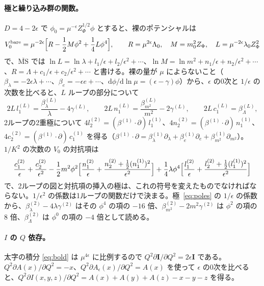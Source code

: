 \documentclass[a4paper,10pt]{ltjsarticle}
\newcommand{\dd}{\mathrm{d}}
\newcommand{\MSbar}{\overline{\mathrm{MS}}}
\newcommand{\Aeps}{A_\epsilon}
\begin{document}
\paragraph{極と繰り込み群の関数。}$D=4-2\epsilon$ で $\phi_0=\mu^{-\epsilon}Z_\Phi^{1/2}\phi$ とすると、裸のポテンシャルは
\begin{equation*}
V_0^{\mathrm{bare}}=\mu^{-2\epsilon}\Bigl[R-\frac12M\phi^2+\frac14L\phi^4\Bigr],\qquad R=\mu^{2\epsilon}\Lambda_0,\quad M=m_0^2Z_\Phi,\quad L=\mu^{-2\epsilon}\lambda_0Z_\Phi^2
\end{equation*}
で、$\MSbar$ では $\ln L=\ln\lambda+l_1/\epsilon+l_2/\epsilon^2+\cdots$、$\ln M=\ln m^2+n_1/\epsilon+n_2/\epsilon^2+\cdots$、$R=\Lambda+c_1/\epsilon+c_2/\epsilon^2+\cdots$ と書ける。裸の量が $\mu$ によらないこと（$\beta_\lambda=-2\epsilon\lambda+\cdots$、$\beta_e=-\epsilon e+\cdots$、$\dd\phi/\dd\ln\mu=(\epsilon-\gamma)\phi$）から、$\epsilon$ の0次と $1/\epsilon$ の次数を比べると、$L$ ループの部分について
\begin{equation*}
2L\,l_1^{(L)}=\frac{\beta_\lambda^{(L)}}\lambda-4\gamma^{(L)},\qquad 2L\,n_1^{(L)}=\frac{\beta_{m^2}^{(L)}}{m^2}-2\gamma^{(L)},\qquad 2L\,c_1^{(L)}=\beta_\Lambda^{(L)},
\end{equation*}
2ループの2重極について $4l_2^{(2)}=(\beta^{(1)}\!\cdot\partial)\,l_1^{(1)}$、$4n_2^{(2)}=(\beta^{(1)}\!\cdot\partial)\,n_1^{(1)}$、$4c_2^{(2)}=(\beta^{(1)}\!\cdot\partial)\,c_1^{(1)}$ を得る（$\beta^{(1)}\!\cdot\partial=\beta_\lambda^{(1)}\partial_\lambda+\beta_e^{(1)}\partial_e+\beta_{m^2}^{(1)}\partial_{m^2}$）。$1/K^2$ の次数の $V_0$ の対抗項は
\begin{equation*}
\frac{c_1^{(2)}}\epsilon+\frac{c_2^{(2)}}{\epsilon^2}-\frac12m^2\phi^2\Bigl[\frac{n_1^{(2)}}\epsilon+\frac{n_2^{(2)}+\frac12(n_1^{(1)})^2}{\epsilon^2}\Bigr]+\frac14\lambda\phi^4\Bigl[\frac{l_1^{(2)}}\epsilon+\frac{l_2^{(2)}+\frac12(l_1^{(1)})^2}{\epsilon^2}\Bigr]
\end{equation*}
で、2ループの図と対抗項の挿入の極は、これの符号を変えたものでなければならない。$1/\epsilon^2$ の係数は1ループの関数だけで決まる。極~\eqref{eq:poles} の $1/\epsilon$ の係数から、$\beta_\lambda^{(2)}-4\lambda\gamma^{(2)}$ はその $\phi^4$ の項の $-16$ 倍、$\beta_{m^2}^{(2)}-2m^2\gamma^{(2)}$ は $\phi^2$ の項の $8$ 倍、$\beta_\Lambda^{(2)}$ は $\phi^0$ の項の $-4$ 倍として読める。

\paragraph{$I$ の $Q$ 依存。}太字の積分 \eqref{eq:bold} は $\mu^{4\epsilon}$ に比例するので $Q^2\partial\mathbf I/\partial Q^2=2\epsilon\mathbf I$ である。$Q^2\partial A(x)/\partial Q^2=-x$、$Q^2\partial\Aeps(x)/\partial Q^2=A(x)$ を使って $\epsilon$ の0次を比べると、$Q^2\partial I(x,y,z)/\partial Q^2=A(x)+A(y)+A(z)-x-y-z$ を得る。
\end{document}
